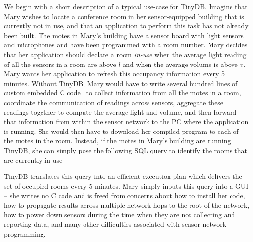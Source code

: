 \documentclass[11pt]{article}
\begin{document}
We begin with a short description of a typical use-case for TinyDB.  Imagine that Mary
wishes to locate a conference room in her sensor-equipped building that is currently not in use, and
that an application to perform this task has not already been built.
The motes in Mary's
building have a sensor board with light sensors and microphones and have been programmed with
a room number.  Mary decides that her application
should declare a room {\it in-use} when the average light reading of all the sensors in a room
are above $l$ and when the average volume is above $v$.  Mary wants her application to 
refresh this occupancy information every 5 minutes.  Without TinyDB, Mary
would have to write several hundred lines of custom embedded C
code~ to collect information
from all the motes in a room, coordinate the communication of readings
across sensors,
aggregate these readings together to compute the average light
and volume, and then forward that information from within the sensor network to the PC where
the application is running.  She would then have to download her compiled
program to each of the motes in the room.  Instead, if the motes in Mary's building are running TinyDB,
she can simply pose the following SQL
query to identify the rooms that are currently in-use:


\noindent TinyDB translates this query into an efficient
execution plan which
delivers the set of occupied rooms every 5 minutes.  Mary simply inputs this query
into a GUI -- she writes no C code and is freed from 
concerns about how to install her code, how to propagate results across
multiple network hops to the root of the network, how to power down sensors 
during the time when they are not collecting and reporting data, and many other
difficulties associated with sensor-network programming.
\end{document}
